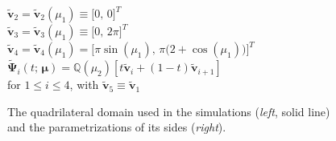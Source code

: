 \documentclass[12pt, a4paper, twoside, openright, notitlepage]{report}
\numberwithin{equation}{chapter}
\theoremstyle{theorem}
\theoremstyle{definition}
\theoremstyle{remark}
\theoremstyle{proposition}
\numberwithin{figure}{chapter}
\newcommand{\wt}[1]{\widetilde{#1}}
\newcommand{\bg}[1]{\boldsymbol{#1}}
\begin{document}
\begin{figure}[H]
\begin{minipage}{0.5\textwidth}
				$\wt{\bg{v}}_2 = \wt{\bg{v}}_2(\mu_1) \equiv \big[ 0, \, 0 \big]^T$ \\[0.2cm]
				$\wt{\bg{v}}_3 = \wt{\bg{v}}_3(\mu_1) \equiv \big[ 0, \, 2 \pi \big]^T$ \\[0.2cm]
				$\wt{\bg{v}}_4 = \wt{\bg{v}}_4(\mu_1) = \big[ \pi \sin(\mu_1), \, \pi \big( 2 + \cos(\mu_1) \big) \big]^T$ \\[0.2cm]
				$\wt{\bg{\Psi}}_i(t; \, \bg{\mu}) = \mathbb{Q}(\mu_2) \left[ t \wt{\bg{v}}_i + (1-t) \wt{\bg{v}}_{i+1} \right]$ \\
				\hspace*{0.5cm} for $1 \leq i \leq 4$, with $\wt{\bg{v}}_5 \equiv \wt{\bg{v}}_1$
			\end{minipage}
			
			\vspace*{0.1cm}
			
			\caption{The quadrilateral domain used in the simulations (\emph{left}, solid line) and the parametrizations of its sides (\emph{right}).}
			\label{fig:quadrilateral-domain}
			
			\vspace*{0.45cm}
		

\end{figure}
\end{document}
